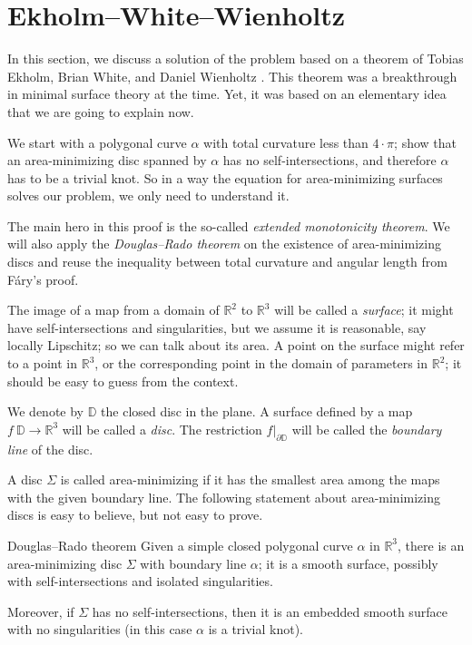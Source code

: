  \section{Ekholm--White--Wienholtz}

In this section, we discuss a solution of the problem based on a theorem of Tobias Ekholm, Brian White, and Daniel Wienholtz \cite{EWW_embed}.
This theorem was a breakthrough in minimal surface theory at the time.
Yet, it was based on an elementary idea that we are going to explain now.

We start with a polygonal curve $\alpha$ with total curvature less than $4\cdot\pi$;
show that an area-minimizing disc spanned by $\alpha$ has no self-intersections, and therefore $\alpha$ has to be a trivial knot.
So in a way the equation for area-minimizing surfaces solves our problem, we only need to understand it.

The main hero in this proof is the so-called \emph{extended monotonicity theorem}.
We will also apply the \emph{Douglas--Rado theorem} on the existence of area-minimizing discs and reuse the inequality between total curvature and angular length from F\'ary's proof.

The image of a map from a domain of $\mathbb{R}^2$ to $\mathbb{R}^3$ will be called a \emph{surface};
it might have self-intersections and singularities, but we assume it is reasonable, say locally Lipschitz; so we can talk about its area.
A point on the surface might refer to a point in $\mathbb{R}^3$, or the corresponding point in the domain of parameters in $\mathbb{R}^2$;
it should be easy to guess from the context.

We denote by $\mathbb{D}$ the closed disc in the plane.
A surface defined by a map $f\:\mathbb{D}\to\mathbb{R}^3$ will be called a \emph{disc}.
The restriction $f|_{\partial \mathbb{D}}$ will be called the \emph{boundary line} of the disc.

A disc $\Sigma$ is called area-minimizing if it has the smallest area among the maps with the given boundary line.
The following statement about area-minimizing discs is easy to believe, but not easy to prove. %

\begin{thm}{Douglas--Rado theorem}\label{thm:min-exists}
Given a simple closed polygonal curve $\alpha$ in $\mathbb{R}^3$, there is an area-minimizing disc $\Sigma$ with boundary line $\alpha$; it is a smooth surface, possibly with self-intersections and isolated singularities.

Moreover, if $\Sigma$ has no self-intersections, then it is an embedded smooth surface with no singularities (in this case $\alpha$ is a trivial knot).
\end{thm}

